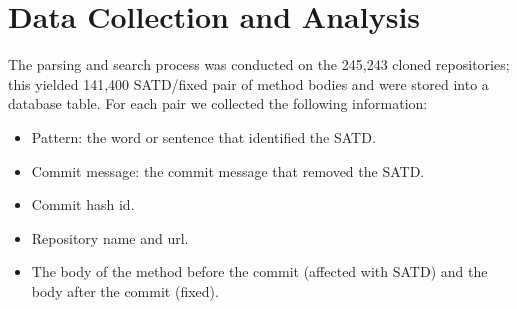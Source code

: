 

\section{Data Collection and Analysis}


The parsing and search process was conducted on the 245,243 cloned repositories; this yielded 141,400 SATD/fixed pair of method bodies and were stored into a database table.
For each pair we collected the following information:
\begin{itemize}
    \item Pattern: the word or sentence that identified the SATD.
    \item Commit message: the commit message that removed the SATD.
    \item Commit hash id.
    \item Repository name and url.
    \item The body of the method before the commit (affected with SATD) and the body after the commit (fixed).
\end{itemize}

